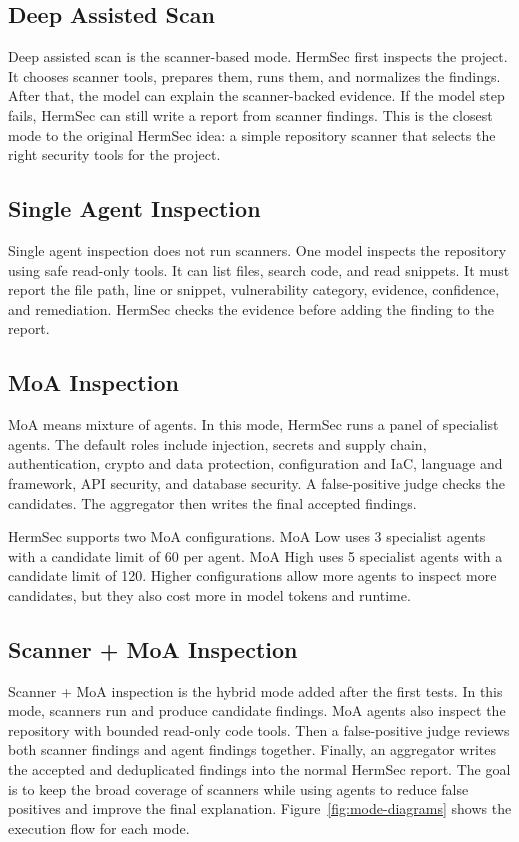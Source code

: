 \documentclass[sigconf,nonacm]{acmart}
\begin{document}
\subsection{Deep Assisted Scan}
Deep assisted scan is the scanner-based mode. HermSec first inspects the project. It chooses scanner tools, prepares them, runs them, and normalizes the findings. After that, the model can explain the scanner-backed evidence. If the model step fails, HermSec can still write a report from scanner findings. This is the closest mode to the original HermSec idea: a simple repository scanner that selects the right security tools for the project.

\subsection{Single Agent Inspection}
Single agent inspection does not run scanners. One model inspects the repository using safe read-only tools. It can list files, search code, and read snippets. It must report the file path, line or snippet, vulnerability category, evidence, confidence, and remediation. HermSec checks the evidence before adding the finding to the report.

\subsection{MoA Inspection}
MoA means mixture of agents. In this mode, HermSec runs a panel of specialist agents. The default roles include injection, secrets and supply chain, authentication, crypto and data protection, configuration and IaC, language and framework, API security, and database security. A false-positive judge checks the candidates. The aggregator then writes the final accepted findings.

HermSec supports two MoA configurations. MoA Low uses 3 specialist agents with a candidate limit of 60 per agent. MoA High uses 5 specialist agents with a candidate limit of 120. Higher configurations allow more agents to inspect more candidates, but they also cost more in model tokens and runtime.

\subsection{Scanner + MoA Inspection}
Scanner + MoA inspection is the hybrid mode added after the first tests. In this mode, scanners run and produce candidate findings. MoA agents also inspect the repository with bounded read-only code tools. Then a false-positive judge reviews both scanner findings and agent findings together. Finally, an aggregator writes the accepted and deduplicated findings into the normal HermSec report. The goal is to keep the broad coverage of scanners while using agents to reduce false positives and improve the final explanation. Figure~\ref{fig:mode-diagrams} shows the execution flow for each mode.
\end{document}
